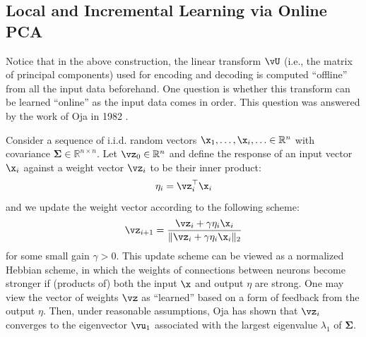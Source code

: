 \documentclass[../../book-main.tex]{subfiles}
\begin{document}
\subsection{Local and Incremental Learning via Online PCA}
Notice that in the above construction, the
linear transform $\vU$ (i.e., the matrix of principal components)
used for encoding and decoding is computed ``offline'' from all
the input data beforehand. One question is whether this transform
can be learned ``online'' as the input data comes in order. This
question was answered by the work of Oja in 1982 \cite{Oja1982SimplifiedNM}.
\begin{example} Consider a
    sequence of i.i.d. random vectors $\x_1, \ldots, \x_i, \ldots \in
    \mathbb{R}^n$ with covariance $\boldsymbol{\Sigma} \in
    \mathbb{R}^{n\times n}$. Let $\vz_0 \in \mathbb{R}^n$ and define
    the response of an input vector $\x_i$ against a weight vector
    $\vz_i$ to be their inner product:
    \begin{equation}
        \eta_i = \vz_i^\top \x_i
    \end{equation}
    and we update the weight vector according to the following scheme:
    \begin{equation}
        \vz_{i+1} = \frac{\vz_i + \gamma \eta_i \x_i}{\|\vz_i + \gamma
        \eta_i \x_i\|_2}
        \label{eqn:Hebbian}
    \end{equation}
    for some small gain $\gamma >0$. This update scheme can be viewed
    as a normalized Hebbian scheme, in which the weights of connections
    between neurons become stronger if (products of) both the input
    $\x$ and output $\eta$ are strong. One may view the vector of
    weights $\vz$ as ``learned'' based on a form of feedback from the
    output $\eta$.
    Then, under reasonable assumptions, Oja \cite{Oja1982SimplifiedNM} has
    shown that $\vz_i$ converges to the eigenvector $\vu_1$ associated with
    the largest eigenvalue $\lambda_1$ of $\boldsymbol{\Sigma}$.
\end{example}
\end{document}
